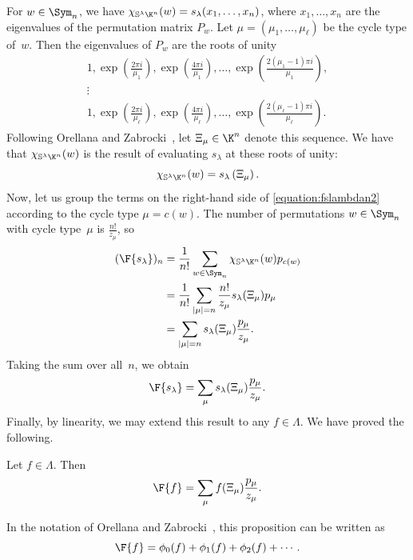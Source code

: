 For $w \in \Sym_n$, we have $\chi_{\mathbb{S}^\lambda \K^n}(w) = s_\lambda(x_1, \ldots, x_n)$, where $x_1, \ldots, x_n$ are the eigenvalues of the permutation matrix $P_w$. Let $\mu = (\mu_1, \ldots, \mu_\ell)$ be the cycle type of~$w$. Then the eigenvalues of $P_w$ are the roots of unity
\begin{gather*}
    1, \exp\left(\frac{2 \pi i}{\mu_1}\right), \exp\left(\frac{4 \pi i}{\mu_1}\right), \ldots, \exp\left(\frac{2(\mu_1 - 1) \pi i}{\mu_1}\right), \\
    \vdots \\
    1, \exp\left(\frac{2 \pi i}{\mu_\ell}\right), \exp\left(\frac{4 \pi i}{\mu_\ell}\right), \ldots, \exp\left(\frac{2(\mu_\ell - 1) \pi i}{\mu_\ell}\right).
\end{gather*}
Following Orellana and Zabrocki~\cite{MR4275829, MR4295089}, let $\Xi_\mu \in \K^n$ denote this sequence. We have that $\chi_{\mathbb{S}^\lambda \K^n}(w)$ is the result of evaluating $s_\lambda$ at these roots of unity: \[\chi_{\mathbb{S}^\lambda \K^n}(w) =
s_\lambda\left(\Xi_\mu\right).\]
Now, let us group the terms on the right-hand side of \eqref{equation:fslambdan2} according to the cycle type $\mu = c(w)$. The number of permutations $w \in \Sym_n$ with cycle type~$\mu$ is $\frac{n!}{z_\mu}$, so 
\begin{align*}(\F{s_\lambda})_n &= \frac{1}{n!} \sum_{w \in \Sym_n} \chi_{\mathbb{S}^\lambda \K^n}(w) p_{c(w)} \\
&= \frac{1}{n!} \sum_{|\mu| = n} \frac{n!}{z_\mu}s_\lambda(\Xi_\mu)p_\mu \\
&= \sum_{|\mu| = n} s_\lambda(\Xi_\mu) \frac{p_\mu}{z_\mu}.\end{align*}
Taking the sum over all~$n$, we obtain \[\F{s_\lambda} = \sum_{\mu} s_\lambda(\Xi_\mu) \frac{p_\mu}{z_\mu}.\]
Finally, by linearity, we may extend this result to any $f \in \Lambda$. We have proved the following.
\begin{prop}\label{proposition:rootsofunityformula}
    Let $f \in \Lambda$. Then \[\F{f} = \sum_{\mu} f(\Xi_\mu) \frac{p_\mu}{z_\mu}.\]
\end{prop}
In the notation of Orellana and Zabrocki~\cite{MR4275829}, this proposition can be written as \[\F{f} = \phi_0(f) + \phi_1(f) + \phi_2(f) + \cdots.\]

